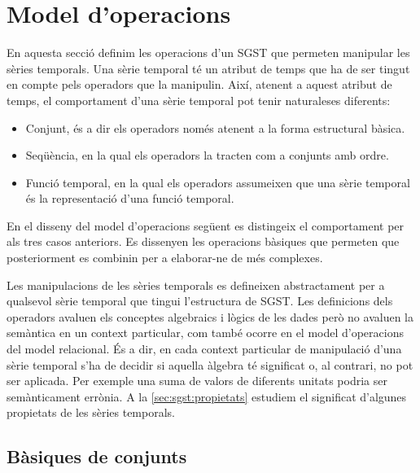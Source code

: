 \section{Model d'operacions}
\label{sec:model:sgst-operacions}

En aquesta secció definim les operacions d'un \gls{SGST} que permeten
manipular les sèries temporals.  Una sèrie temporal té un atribut de
temps que ha de ser tingut en compte pels operadors que la manipulin.
Així, atenent a aquest atribut de temps, el comportament d'una sèrie
temporal pot tenir naturaleses diferents:
\begin{itemize}
\item Conjunt, és a dir els operadors només atenent a la forma
  estructural bàsica.
\item Seqüència, en la qual els operadors la tracten com a conjunts
  amb ordre.
\item Funció temporal, en la qual els operadors assumeixen que una
  sèrie temporal és la representació d'una funció temporal.
\end{itemize}



En el disseny del model d'operacions següent es distingeix el
comportament per als tres casos anteriors.  Es dissenyen les
operacions bàsiques que permeten que posteriorment es combinin per
a elaborar-ne de més complexes.


Les manipulacions de les sèries temporals es defineixen abstractament
per a qualsevol sèrie temporal que tingui l'estructura de \gls{SGST}.
Les definicions dels operadors avaluen els conceptes algebraics i
lògics de les dades però no avaluen la semàntica en un context
particular, com també ocorre en el model d'operacions del
model relacional. És a dir, en cada context particular de manipulació
d'una sèrie temporal s'ha de decidir si aquella àlgebra té significat
o, al contrari, no pot ser aplicada. Per exemple una suma de valors de
diferents unitats podria ser semànticament errònia. A
la \autoref{sec:sgst:propietats} estudiem el significat d'algunes
propietats de les sèries temporals.





\subsection{Bàsiques de conjunts}

